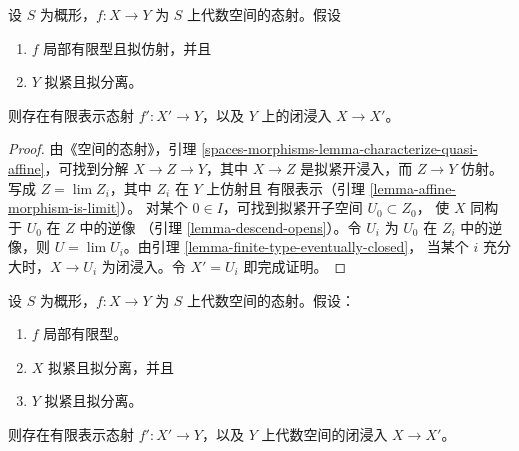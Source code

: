\begin{lemma}
\label{lemma-quasi-affine-closed-in-finite-presentation}
设 $S$ 为概形，$f : X \to Y$ 为 $S$ 上代数空间的态射。假设
\begin{enumerate}
\item $f$ 局部有限型且拟仿射，并且
\item $Y$ 拟紧且拟分离。
\end{enumerate}
则存在有限表示态射 $f' : X' \to Y$，以及 $Y$ 上的闭浸入
$X \to X'$。
\end{lemma}

\begin{proof}
由《空间的态射》，引理
\ref{spaces-morphisms-lemma-characterize-quasi-affine}，可找到分解
$X \to Z \to Y$，其中 $X \to Z$ 是拟紧开浸入，而
$Z \to Y$ 仿射。写成 $Z = \lim Z_i$，其中 $Z_i$ 在 $Y$ 上仿射且
有限表示（引理 \ref{lemma-affine-morphism-is-limit}）。
对某个 $0 \in I$，可找到拟紧开子空间 $U_0 \subset Z_0$，
使 $X$ 同构于 $U_0$ 在 $Z$ 中的逆像
（引理 \ref{lemma-descend-opens}）。令 $U_i$ 为 $U_0$ 在 $Z_i$
中的逆像，则
$U = \lim U_i$。由引理 \ref{lemma-finite-type-eventually-closed}，
当某个 $i$ 充分大时，$X \to U_i$ 为闭浸入。令 $X'=U_i$ 即完成证明。
\end{proof}

\begin{lemma}
\label{lemma-finite-type-closed-in-finite-presentation}
设 $S$ 为概形，$f : X \to Y$ 为 $S$ 上代数空间的态射。假设：
\begin{enumerate}
\item $f$ 局部有限型。
\item $X$ 拟紧且拟分离，并且
\item $Y$ 拟紧且拟分离。
\end{enumerate}
则存在有限表示态射 $f' : X' \to Y$，以及 $Y$ 上代数空间的闭浸入
$X \to X'$。
\end{lemma}


